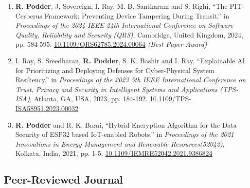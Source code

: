 \documentclass[11pt, a4paper]{article}
\begin{document}
\begin{enumerate}[leftmargin=*, label=\arabic*., itemsep=4pt, topsep=2pt]
\item \textbf{\color{cvred}R. Podder}, J. Sovereign, I. Ray, M. B. Santharam and S. Righi, ``The PIT-Cerberus Framework: Preventing Device Tampering During Transit.'' in \textit{Proceedings of the 2024 IEEE 24th International Conference on Software Quality, Reliability and Security (QRS)}, Cambridge, United Kingdom, 2024, pp. 584-595. \href{https://doi.org/10.1109/QRS62785.2024.00064}{\color{cvgray}10.1109/QRS62785.2024.00064} \textit{(Best Paper Award)}

\item I. Ray, S. Sreedharan, \textbf{\color{cvred}R. Podder}, S. K. Bashir and I. Ray, ``Explainable AI for Prioritizing and Deploying Defenses for Cyber-Physical System Resiliency.'' in \textit{Proceedings of the 2023 5th IEEE International Conference on Trust, Privacy and Security in Intelligent Systems and Applications (TPS-ISA)}, Atlanta, GA, USA, 2023, pp. 184-192. \href{https://doi.org/10.1109/TPS-ISA58951.2023.00032}{\color{cvgray}10.1109/TPS-ISA58951.2023.00032}

\item \textbf{\color{cvred}R. Podder} and R. K. Barai, ``Hybrid Encryption Algorithm for the Data Security of ESP32 based IoT-enabled Robots.'' in \textit{Proceedings of the 2021 Innovations in Energy Management and Renewable Resources(52042)}, Kolkata, India, 2021, pp. 1-5. \href{https://doi.org/10.1109/IEMRE52042.2021.9386824}{\color{cvgray}10.1109/IEMRE52042.2021.9386824}

\end{enumerate}

\subsection{\color{cvred}Peer-Reviewed Journal}
\end{document}
